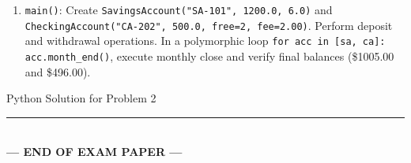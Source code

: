\documentclass[11pt,a4paper]{article}
\begin{document}
\begin{enumerate}[label=\arabic*.,leftmargin=2em,itemsep=1.0pt]
  \begin{itemize}[itemsep=0.5pt]
  \item \texttt{\_\_init\_\_(self, acc\_num, balance=0.0, free=3, fee=1.50)}: Delegate via \texttt{super()}; store \texttt{\_free} (int), \texttt{\_fee} (float), initialize \texttt{\_trans = 0}.
  \item Overrides \texttt{deposit(self, amount)} and \texttt{withdraw(self, amount)}: Delegate to \texttt{super()} and increment \texttt{\_trans} upon success.
  \item Overrides \texttt{month\_end(self)}: Deduct excess fees $\max(0, \text{\_trans} - \text{\_free}) \times \text{\_fee}$ from balance. Reset $\text{\_trans} = 0$, and return fee charged.
  \end{itemize}
\item \texttt{main()}: Create \texttt{SavingsAccount("SA-101", 1200.0, 6.0)} and \texttt{CheckingAccount("CA-202", 500.0, free=2, fee=2.00)}. Perform deposit and withdrawal operations. In a polymorphic loop \lstinline|for acc in [sa, ca]: acc.month_end()|, execute monthly close and verify final balances (\$1005.00 and \$496.00).
\end{enumerate}
\begin{answerbox}[height=8.5cm]{Python Solution for Problem 2}\end{answerbox}
\vfill
\begin{center}\rule{0.5\textwidth}{0.4pt}\\[1mm]
\textbf{\color{primaryblue}--- END OF EXAM PAPER ---}
\end{center}
\end{document}
